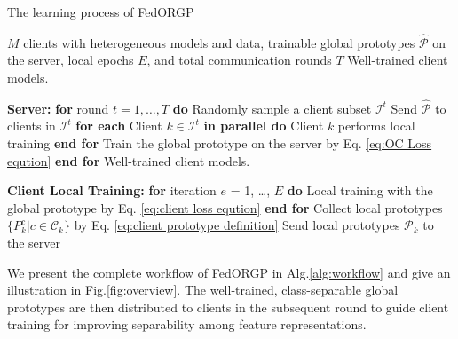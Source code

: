 \begin{algorithm}[t]
\caption{The learning process of FedORGP}
\label{alg:workflow}
\begin{algorithmic}[1]
    \Require $M$ clients with heterogeneous models and data, trainable global prototypes $\hat{\mathcal{P}}$ on the server, local epochs $E$, and total communication rounds $T$
    \Ensure Well-trained client models.

    \State \textbf{Server:}
    \State \textbf{for} round $t = 1, \dots, T$ \textbf{do}
        \State \quad Randomly sample a client subset $\mathcal{I}^t$
        \State \quad Send $\hat{\mathcal{P}}$ to clients in $\mathcal{I}^t$
        \State \quad \textbf{for each} Client $k \in \mathcal{I}^t$ \textbf{in parallel do}
            \State \quad\quad Client $k$ performs local training
        \State \quad \textbf{end for}
        \State \quad Train the global prototype on the server by Eq. \ref{eq:OC Loss eqution}
    \State \textbf{end for}
    \State \Return Well-trained client models.

    \State \textbf{Client Local Training:}
    \State \quad \textbf{for} iteration $e$ = 1, \ldots, $E$ \textbf{do}
    \State \quad \quad Local training with the global prototype by Eq. \ref{eq:client loss eqution}
    \State \quad \textbf{end for}
    \State \quad Collect local prototypes $\{P^c_k | c \in \mathcal{C}_k\}$ by Eq. \ref{eq:client prototype definition}
    \State \quad Send local prototypes $\mathcal{P}_k$ to the server
\end{algorithmic}
\end{algorithm}


We present the complete workflow of FedORGP in Alg.\ref{alg:workflow} and give an illustration in Fig.\ref{fig:overview}. The well-trained, class-separable global prototypes are then distributed to clients in the subsequent round to guide client training for improving separability among feature representations.